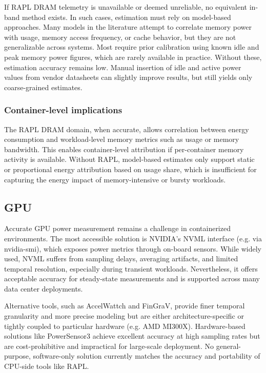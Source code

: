 If RAPL DRAM telemetry is unavailable or deemed unreliable, no equivalent in-band method exists. In such cases, estimation must rely on model-based approaches. Many models in the literature attempt to correlate memory power with usage, memory access frequency, or cache behavior, but they are not generalizable across systems. Most require prior calibration using known idle and peak memory power figures, which are rarely available in practice. Without these, estimation accuracy remains low. Manual insertion of idle and active power values from vendor datasheets can slightly improve results, but still yields only coarse-grained estimates.

\subsubsection{Container-level implications}
The RAPL DRAM domain, when accurate, allows correlation between energy consumption and workload-level memory metrics such as usage or memory bandwidth. This enables container-level attribution if per-container memory activity is available. Without RAPL, model-based estimates only support static or proportional energy attribution based on usage share, which is insufficient for capturing the energy impact of memory-intensive or bursty workloads.

\subsection{GPU}

Accurate GPU power measurement remains a challenge in containerized environments. The most accessible solution is NVIDIA’s NVML interface (e.g. via nvidia-smi), which exposes power metrics through on-board sensors. While widely used, NVML suffers from sampling delays, averaging artifacts, and limited temporal resolution, especially during transient workloads. Nevertheless, it offers acceptable accuracy for steady-state measurements and is supported across many data center deployments.

Alternative tools, such as AccelWattch and FinGraV, provide finer temporal granularity and more precise modeling but are either architecture-specific or tightly coupled to particular hardware (e.g. AMD MI300X). Hardware-based solutions like PowerSensor3 achieve excellent accuracy at high sampling rates but are cost-prohibitive and impractical for large-scale deployment. No general-purpose, software-only solution currently matches the accuracy and portability of CPU-side tools like RAPL.

